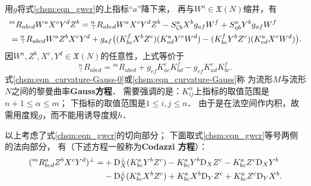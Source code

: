 用${g}$将式\eqref{chsm:eqn_gwcr}的上指标“$a$”降下来，
再与$W^a\in \mathfrak{X}(N)$缩并，有
\begin{align}
     &{}^{m}{R}_{abcd} W^a X^c Y^d Z^b ={}^{n}_{\top}{R}_{abcd} W^a X^c Y^d Z^b
    - S^a_{\zeta b} X^b g_{af}W^f + S^a_{\eta b} Y^b g_{af}W^f \label{chsm:eqn_curvature-Gauss-0} \\
     &= {}^{n}_{\top}{R}_{abcd} W^a Z^b X^c Y^d
     + {g}_{af} \bigl( (K^f_{bc} X^b Z^c) (K^a_{ed} Y^e W^d)
     -(K^f_{bc} Y^b Z^c) (K^a_{ed} X^e W^d) \bigr) .   \notag
\end{align}
因$W^a, Z^b, X^c, Y^d \in \mathfrak{X}(N)$的任意性，上式等价于
\begin{equation}\label{chsm:eqn_curvature-Gauss}
    {}^{n}_{\top}{R}_{abcd} = {}^{m}{R}_{abcd} +{g}_{ef} K^e_{ac} K^f_{bd} -{g}_{ef} K^e_{ad}K^f_{bc} .
\end{equation}
式\eqref{chsm:eqn_curvature-Gauss-0}或\eqref{chsm:eqn_curvature-Gauss}称
为流形$M$与流形$N$之间的黎曼曲率{\heiti \bfseries Gauss方程}．
需要强调的是：$K^\alpha_{ij}$上指标的取值范围是$n+1\leqslant \alpha \leqslant {m}$；
下指标的取值范围是$1\leqslant i,j \leqslant n$．
由于是在法空间作内积，故需用度规${g}$，而不能用诱导度规$h$．

以上考虑了式\eqref{chsm:eqn_gwcr}的切向部分；
下面取式\eqref{chsm:eqn_gwcr}等号两侧的法向部分，
有（下述方程一般称为{\heiti \bfseries Codazzi 方程}）：
\begin{equation}\label{chsm:eqn_Codazzi}
\begin{aligned}
    ({}^{m}{R}^a_{bcd} Z^b X^c Y^d)^\bot =&+
      {\rm D}^\bot_{X} (K^{a}_{bc} Y^b Z^c) - K^{a}_{bc}Y^b {\rm D}_{X}Z^c - K^a_{bc} Z^c {\rm D}_{X} Y^b  \\
   &- {\rm D}^\bot_{Y} (K^{a}_{bc} X^b Z^c) + K^{a}_{bc}X^b {\rm D}_{Y}Z^c + K^a_{bc} Z^c {\rm D}_{Y} X^b .
\end{aligned}
\end{equation}  %


